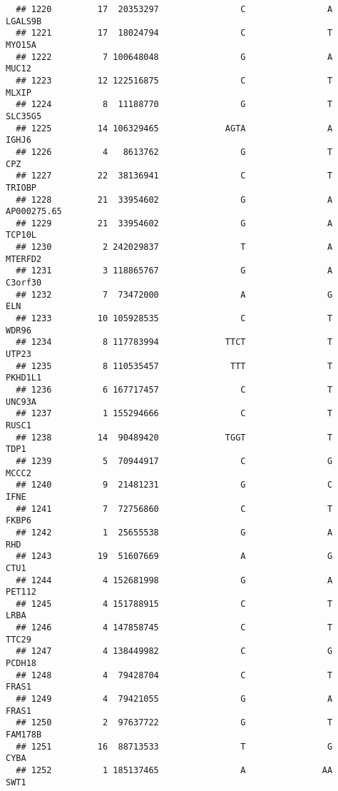 \documentclass[12pt,twoside]{reedthesis}
\theoremstyle{definition}
\theoremstyle{definition}
\theoremstyle{remark}
\begin{document}
\begin{verbatim}
  ## 1220         17  20353297                C                A        LGALS9B
  ## 1221         17  18024794                C                T         MYO15A
  ## 1222          7 100648048                G                A          MUC12
  ## 1223         12 122516875                C                T          MLXIP
  ## 1224          8  11188770                G                T        SLC35G5
  ## 1225         14 106329465             AGTA                A          IGHJ6
  ## 1226          4   8613762                G                T            CPZ
  ## 1227         22  38136941                C                T         TRIOBP
  ## 1228         21  33954602                G                A    AP000275.65
  ## 1229         21  33954602                G                A         TCP10L
  ## 1230          2 242029837                T                A        MTERFD2
  ## 1231          3 118865767                G                A        C3orf30
  ## 1232          7  73472000                A                G            ELN
  ## 1233         10 105928535                C                T          WDR96
  ## 1234          8 117783994             TTCT                T          UTP23
  ## 1235          8 110535457              TTT                T        PKHD1L1
  ## 1236          6 167717457                C                T         UNC93A
  ## 1237          1 155294666                C                T          RUSC1
  ## 1238         14  90489420             TGGT                T           TDP1
  ## 1239          5  70944917                C                G          MCCC2
  ## 1240          9  21481231                G                C           IFNE
  ## 1241          7  72756860                C                T          FKBP6
  ## 1242          1  25655538                G                A            RHD
  ## 1243         19  51607669                A                G           CTU1
  ## 1244          4 152681998                G                A         PET112
  ## 1245          4 151788915                C                T           LRBA
  ## 1246          4 147858745                C                T          TTC29
  ## 1247          4 138449982                C                G         PCDH18
  ## 1248          4  79428704                C                T          FRAS1
  ## 1249          4  79421055                G                A          FRAS1
  ## 1250          2  97637722                G                T        FAM178B
  ## 1251         16  88713533                T                G           CYBA
  ## 1252          1 185137465                A               AA           SWT1

\end{verbatim}
\end{document}
